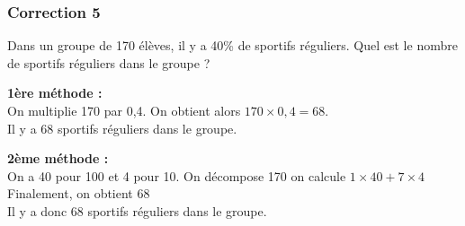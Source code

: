 \documentclass[15pt, mathserif]{beamer}
\begin{document}
\begin{frame}
\vspace{-10mm}
	\frametitle{Correction 5}
Dans un groupe de 170 élèves, il y a 40\% de sportifs réguliers. Quel est le nombre de sportifs réguliers dans le groupe ? \begin{multicols}{2} \textbf{1ère méthode : \\} On multiplie 170 par 0,4. On obtient alors $170 \times 0,4=68$. \\ Il y a 68 sportifs réguliers dans le groupe. 
 \columnbreak 
 
 \textbf{2ème méthode :} \\ On a 40 pour 100 et 4 pour 10. On décompose 170 on calcule $1\times40+7\times4$ \\ Finalement, on obtient 68\\ Il y a donc 68 sportifs réguliers dans le groupe. \end{multicols}\end{frame}
\end{document}
